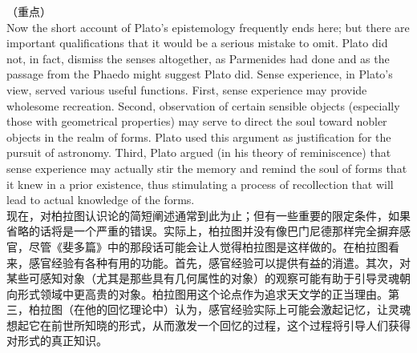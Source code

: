 \documentclass{article}
\begin{document}
（重点）\\
Now the short account of Plato’s epistemology frequently ends here; but there are important qualifications that it would be a serious mistake to omit. Plato did not, in fact, dismiss the senses altogether, as Parmenides had done and as the passage from the Phaedo might suggest Plato did. Sense experience, in Plato’s view, served various useful functions. First, sense experience may provide wholesome recreation. Second, observation of certain sensible objects (especially those with geometrical properties) may serve to direct the soul toward nobler objects in the realm of forms. Plato used this argument as justification for the pursuit of astronomy. Third, Plato argued (in his theory of reminiscence) that sense experience may actually stir the memory and remind the soul of forms that it knew in a prior existence, thus stimulating a process of recollection that will lead to actual knowledge of the forms.\\
现在，对柏拉图认识论的简短阐述通常到此为止；但有一些重要的限定条件，如果省略的话将是一个严重的错误。实际上，柏拉图并没有像巴门尼德那样完全摒弃感官，尽管《斐多篇》中的那段话可能会让人觉得柏拉图是这样做的。在柏拉图看来，感官经验有各种有用的功能。首先，感官经验可以提供有益的消遣。其次，对某些可感知对象（尤其是那些具有几何属性的对象）的观察可能有助于引导灵魂朝向形式领域中更高贵的对象。柏拉图用这个论点作为追求天文学的正当理由。第三，柏拉图（在他的回忆理论中）认为，感官经验实际上可能会激起记忆，让灵魂想起它在前世所知晓的形式，从而激发一个回忆的过程，这个过程将引导人们获得对形式的真正知识。\\
\end{document}
